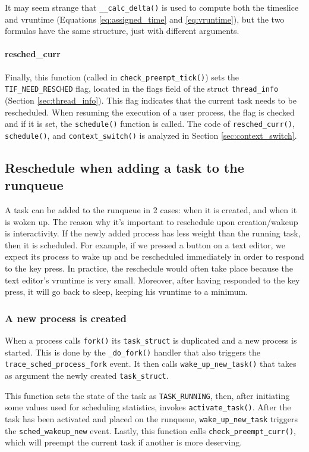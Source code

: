 It may seem strange that \verb|__calc_delta()| is used to compute both the timeslice and vruntime (Equations \ref{eq:assigned_time} and \ref{eq:vruntime}), but the two formulas have the same structure, just with different arguments.

\paragraph{resched\_curr}\label{trace:wake_idle_without_ipi}
Finally, this function (called in \verb|check_preempt_tick()|) sets the \verb|TIF_NEED_RESCHED| flag, located in the flags field of the struct \verb|thread_info| (Section \ref{sec:thread_info}). 
This flag indicates that the current task needs to be rescheduled. When resuming the execution of a user process, the flag is checked and if it is set, the \verb|schedule()| function is called. The code of \verb|resched_curr()|, \verb|schedule()|, and \verb|context_switch()| is analyzed in Section \ref{sec:context_switch}.

\subsection{Reschedule when adding a task to the runqueue}
\label{sec:runqueue_wakeup_reschedule}
A task can be added to the runqueue in 2 cases: when it is created, and when it is woken up. The reason why it's important to reschedule upon creation/wakeup is interactivity. If the newly added process has less weight than the running task, then it is scheduled. For example, if we pressed a button on a text editor, we expect its process to wake up and be rescheduled immediately in order to respond to the key press. In practice, the reschedule would often take place because the text editor's vruntime is very small. Moreover, after having responded to the key press, it will go back to sleep, keeping his vruntime to a minimum.

\subsubsection{A new process is created}
When a process calls \verb|fork()| its \verb|task_struct| is duplicated and a new process is started. This is done by the \verb|_do_fork()| handler that also triggers the \verb|trace_sched_process_fork|\label{trace:sched_process_fork} event. It then calls \verb|wake_up_new_task()| that takes as argument the newly created \verb|task_struct|. 

This function sets the state of the task as \verb|TASK_RUNNING|, then, after initiating some values used for scheduling statistics, invokes \verb|activate_task()|. After the task has been activated and placed on the runqueue, \verb|wake_up_new_task| triggers the \verb|sched_wakeup_new| \label{trace:sched_wakeup_new} event. Lastly, this function calls \verb|check_preempt_curr()|, which will preempt the current task if another is more deserving. 

